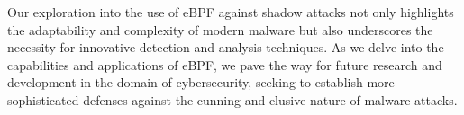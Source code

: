 Our exploration into the use of eBPF against shadow attacks not only highlights the adaptability and
complexity of modern malware but also underscores the necessity for innovative detection and analysis
techniques. As we delve into the capabilities and applications of eBPF, we pave the way for future
research and development in the domain of cybersecurity, seeking to establish more sophisticated defenses
against the cunning and elusive nature of malware attacks.
